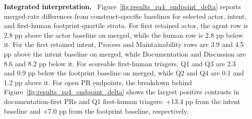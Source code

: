 \documentclass[10pt,conference,anonymous]{IEEEtran}
\newcommand{\runinhead}[1]{\noindent\textbf{#1.}\ }
\begin{document}
\runinhead{Integrated interpretation}
Figure~\ref{fig:results_rq4_endpoint_delta} reports merged-rate differences from construct-specific baselines for selected actor, intent, and first-human footprint-quartile strata.
For first retained actor, the agent row is 2.8 pp above the actor baseline on merged, while the human row is 2.8 pp below it.
For the first retained intent, Process and Maintainability rows are 3.9 and 4.5 pp above the intent baseline on merged, while Documentation and Discussion are 8.6 and 8.2 pp below it.
For scoreable first-human triagers, Q1 and Q3 are 2.3 and 0.9 pp below the footprint baseline on merged, while Q2 and Q4 are 0.1 and 1.2 pp above it.
For open PR endpoints, the breakdown behind Figure~\ref{fig:results_rq4_endpoint_delta} shows the largest positive contrasts in documentation-first PRs and Q1 first-human triagers: +13.4 pp from the intent baseline and +7.0 pp from the footprint baseline, respectively.
\end{document}
